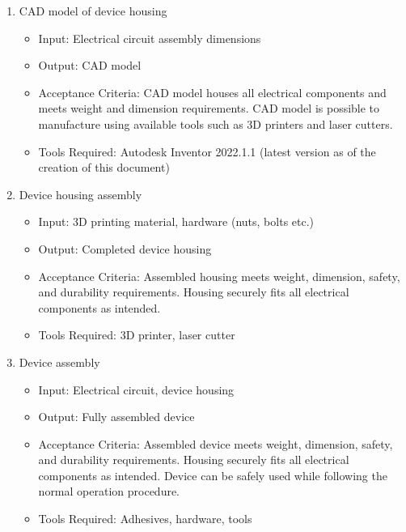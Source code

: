 \documentclass{article}
\begin{document}
\begin{enumerate}
        \item CAD model of device housing
        \begin{itemize}
            \item Input: Electrical circuit assembly dimensions
            \item Output: CAD model
            \item Acceptance Criteria: CAD model houses all electrical components and meets weight and dimension requirements. CAD model is possible to manufacture using available tools such as 3D printers and laser cutters.  
            \item Tools Required: Autodesk Inventor 2022.1.1 (latest version as of the creation of this document)
        \end{itemize}
        
        \item Device housing assembly
        \begin{itemize}
            \item Input: 3D printing material, hardware (nuts, bolts etc.)
            \item Output: Completed device housing
            \item Acceptance Criteria: Assembled housing meets weight, dimension, safety, and durability requirements. Housing securely fits all electrical components as intended.
            \item Tools Required: 3D printer, laser cutter
        \end{itemize}
        
        \item Device assembly
        \begin{itemize}
            \item Input: Electrical circuit, device housing 
            \item Output: Fully assembled device
            \item Acceptance Criteria: Assembled device meets weight, dimension, safety, and durability requirements. Housing securely fits all electrical components as intended. Device can be safely used while following the normal operation procedure.
            \item Tools Required: Adhesives, hardware, tools
        \end{itemize}
        

\end{enumerate}
\end{document}
